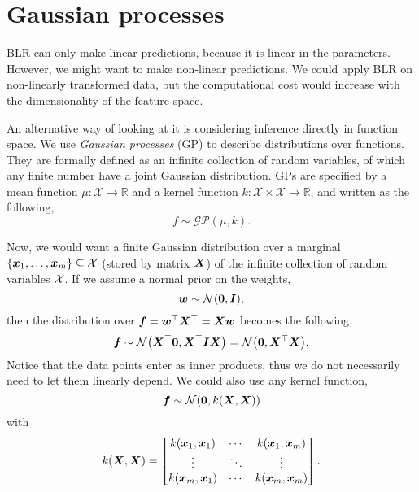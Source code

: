 \section{Gaussian processes}

BLR can only make linear predictions, because it is linear in the parameters.
However, we might want to make non-linear predictions. We could apply BLR on
non-linearly transformed data, but
the computational cost would increase with the dimensionality of the feature
space.

An alternative way of looking at it is considering inference directly in
function space. We use \textit{Gaussian processes} (GP) to describe
distributions over functions. They are formally defined as an infinite
collection of random variables, of which any finite number have a joint Gaussian
distribution. GPs are specified by a mean function $\mu:
\mathcal{X}\to\mathbb{R}$ and a kernel function
$k:\mathcal{X}\times\mathcal{X}\to\mathbb{R}$, and written as the
following, \[
  f \sim \mathcal{GP}(\mu, k).
\]

Now, we would want a finite Gaussian distribution over a marginal
$\{\bm{x}_1,\ldots,\bm{x}_m\} \subseteq \mathcal{X}$ (stored by matrix $\bm{X}$) of
the infinite collection of random variables $\mathcal{X}$. If we assume a normal prior on
the weights, \[
  \bm{w} \sim \mathcal{N}(\bm{0},\bm{I}),
\]
then the distribution
over $\bm{f} = \bm{w}^\top \bm{X}^\top = \bm{X} \bm{w}$
becomes the following, \[
  \vec{f} \sim \mathcal{N} \lft( \transpose{\mat{X}} \vec{0},\transpose{\mat{X}}
  \mat{I} \mat{X} \rgt) = \mathcal{N} \lft( \vec{0},\transpose{\mat{X}} \mat{X} \rgt).
\]
Notice that the data points enter as inner products, thus we do not necessarily
need to let them linearly depend. We could also use any kernel
function,
\[
  \bm{f} \sim \mathcal{N}(\bm{0}, k(\bm{X}, \bm{X}))
\]
with \[
  k(\bm{X}, \bm{X}) = \begin{bmatrix}
    k(\bm{x}_1,\bm{x}_1) & \cdots & k(\bm{x}_1,\bm{x}_m) \\
    \vdots & \ddots & \vdots \\
    k(\bm{x}_m,\bm{x}_1) & \cdots & k(\bm{x}_m,\bm{x}_m)
  \end{bmatrix}.
\]

